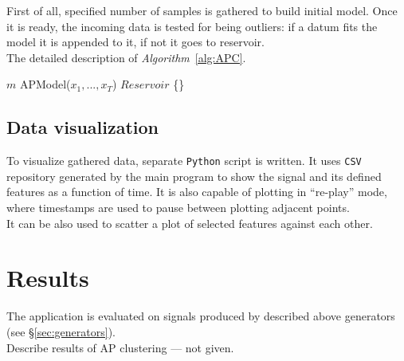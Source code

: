 \documentclass[11pt, letterpaper]{article}            %
\begin{document}
First of all, specified number of samples is gathered to build initial model. Once it is ready, the incoming data is tested for being outliers: if a datum fits the model it is appended to it, if not it goes to reservoir.\\


The detailed description of  \emph{Algorithm}~\ref{alg:APC}.\\

\SetAlCapSkip{1em}
\LinesNumbered
{}
\vspace{2cm}
\begin{algorithm}[h]

  $m$ \leftarrow APModel($x_1, ..., x_T$)\;
  $Reservoir$ \leftarrow \{\}\;

\end{algorithm}
\vspace{2cm}

\subsection{Data visualization}
To visualize gathered data, separate \texttt{Python} script is written. It uses \texttt{CSV} repository generated by the main program to show the signal and its defined features as a function of time. It is also capable of plotting in ``re-play'' mode, where timestamps are used to pause between plotting adjacent points.\\
It can be also used to scatter a plot of selected features against each other.\\


\section{Results}
The application is evaluated on signals produced by described above generators (see §\ref{sec:generators}).\\
Describe results of AP clustering --- not given.
\end{document}
